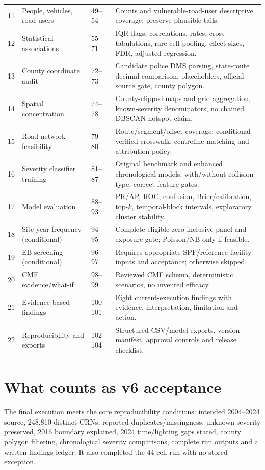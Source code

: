 \documentclass[11pt,a4paper,openany]{report}
\begin{document}
\begin{longtable}{@{}L{9mm}L{48mm}L{17mm}L{67mm}@{}}
11 & People, vehicles, road users & 49--54 & Counts and vulnerable-road-user descriptive coverage; preserve plausible tails.\\
12 & Statistical associations & 55--71 & IQR flags, correlations, rates, cross-tabulations, rare-cell pooling, effect sizes, FDR, adjusted regression.\\
13 & County coordinate audit & 72--73 & Candidate police DMS parsing, state-route decimal comparison, placeholders, official-source gate, county polygon.\\
14 & Spatial concentration & 74--78 & County-clipped maps and grid aggregation, known-severity denominators, no chained DBSCAN hotspot claim.\\
15 & Road-network feasibility & 79--80 & Route/segment/offset coverage; conditional verified crosswalk, centreline matching and attribution policy.\\
16 & Severity classifier training & 81--87 & Original benchmark and enhanced chronological models, with/without collision type, correct feature gates.\\
17 & Model evaluation & 88--93 & PR/AP, ROC, confusion, Brier/calibration, top-$k$, temporal-block intervals, exploratory cluster stability.\\
18 & Site-year frequency (conditional) & 94--95 & Complete eligible zero-inclusive panel and exposure gate; Poisson/NB only if feasible.\\
19 & EB screening (conditional) & 96--97 & Requires appropriate SPF/reference facility inputs and acceptance; otherwise skipped.\\
20 & CMF evidence/what-if & 98--99 & Reviewed CMF schema, deterministic scenarios, no invented efficacy.\\
21 & Evidence-based findings & 100--101 & Eight current-execution findings with evidence, interpretation, limitation and action.\\
22 & Reproducibility and exports & 102--104 & Structured CSV/model exports, version manifest, approval controls and release checklist.\\
\bottomrule\end{longtable}
\normalsize

\section{What counts as v6 acceptance}
The final execution meets the core reproducibility conditions: intended 2004--2024 source, 248,810 distinct CRNs, reported duplicates/missingness, unknown severity preserved, 2016 boundary explained, 2024 time/lighting gaps stated, county polygon filtering, chronological severity comparisons, complete run outputs and a written findings ledger. It also completed the 44-cell run with no stored exception.
\end{document}

